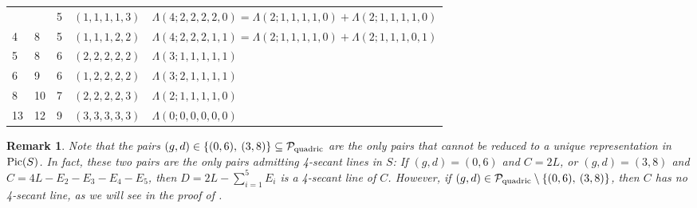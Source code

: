 \documentclass[english,11pt,reqno]{amsart}
\newcommand{\sub}{\subseteq}
\newcommand{\Pic}{\textup{Pic}}
\newtheorem{rmk}[thm]{Remark}
\begin{document}
\begin{table}[H]
\begin{minipage}{\textwidth}
\begin{tabular}{|l|l|l|l|l|}
& & 5 & $(1,1,1,1,3)$ & $\Lambda(4;2,2,2,2,0)=\Lambda(2;1,1,1,1,0)+\Lambda(2;1,1,1,1,0)$   \\
4 & 8 &5  & $(1,1,1,2,2)$ &  $\Lambda(4;2,2,2,1,1)=\Lambda(2;1,1,1,1,0)+\Lambda(2;1,1,1,0,1)$   \\
5& 8 & 6 & $(2,2,2,2,2)$ & $\Lambda(3;1,1,1,1,1)$   \\
6& 9 & 6 & $(1,2,2,2,2)$ & $\Lambda(3;2,1,1,1,1)$   \\
8& 10 & 7 & $(2,2,2,2,3)$ & $\Lambda(2;1,1,1,1,0)$  \\
13 & 12 & 9 & $(3,3,3,3,3)$ & $\Lambda(0;0,0,0,0,0)$ \\
\hline
\end{tabular}
\end{minipage}
\end{table}

%
\begin{rmk} \label{rmk:quadric_del_Pezzo_4_secant_lines}
Note that the pairs $(g,d)\in \{(0,6),\: (3,8)\}\sub \mathcal{P}_{\textup{quadric}}$ are the only pairs that cannot be reduced to a unique representation in $\Pic(S)$. In fact, these two pairs are the only pairs admitting 4-secant lines in $S$: If $(g,d)=(0,6)$ and $C=2L$, or $(g,d)=(3,8)$ and $C=4L-E_2-E_3-E_4-E_5$, then $D=2L-\sum_{i=1}^5 E_i$ is a 4-secant line of $C$. However, if $(g,d)\in \mathcal{P}_{\textup{quadric}}\setminus \{(0,6),\: (3,8)\}$, then $C$ has no 4-secant line, as we will see in the proof of .
\end{rmk}
%
%
%
%
%
\end{document}
